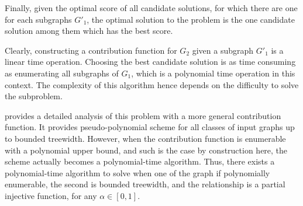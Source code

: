 			Finally, given the optimal score of all candidate solutions, for which there are one for each subgraphs $G'_1$, the optimal solution to the \mwccs{} problem is the one candidate solution among them which has the best score.

			Clearly, constructing a contribution function for $G_2$ given a subgraph $G'_1$ is a linear time operation. Choosing the best candidate solution is as time consuming as enumerating all subgraphs of $G_1$, which is a polynomial time operation in this context. The complexity of this algorithm hence depends on the difficulty to solve the \rbmwcs{} subproblem.

			 provides a detailed analysis of this problem with a more general contribution function.
			It provides pseudo-polynomial scheme for all classes of input graphs up to bounded treewidth.
			However, when the contribution function is enumerable with a polynomial upper bound, and such is the case by construction here, the scheme actually becomes a polynomial-time algorithm.
			Thus, there exists a polynomial-time algorithm to solve \mwccs{} when one of the graph if polynomially enumerable, the second is bounded treewidth, and the relationship is a partial injective function, for any $\alpha \in [0, 1]$.

